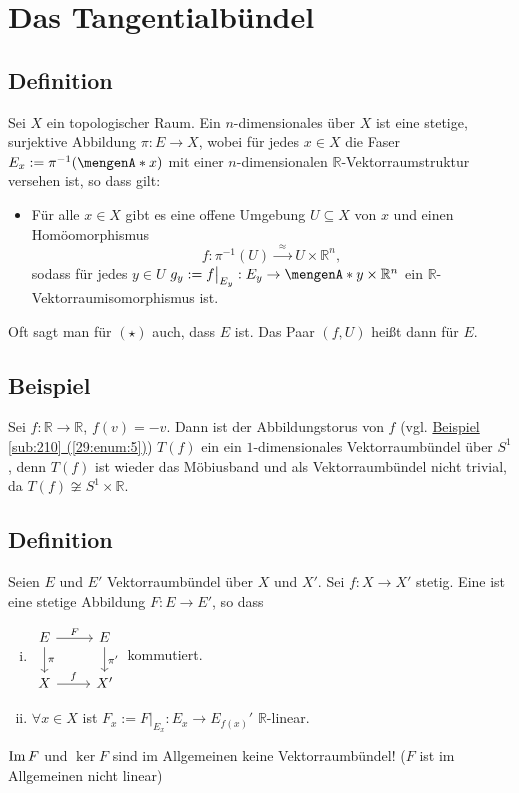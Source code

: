 \section{Das Tangentialbündel} %
\label{sec:19}

\subsection[Definition: Vektorraumbündel]{Definition} %
\label{sub:191}
Sei $X$ ein topologischer Raum. Ein $n$-dimensionales  über $X$ ist eine stetige, surjektive Abbildung $\pi  : E \to X$, wobei für jedes 
$x \in X$ die Faser $E_x := \pi ^{-1} (\set{x})$ mit einer $n$-dimensionalen $\mathds{R}$-Vektorraumstruktur versehen ist, so dass gilt: 
\begin{itemize}[$(\star)$]
	\item Für alle $x \in X$ gibt es eine offene Umgebung $U \subseteq X$ von $x$ und einen Homöomorphismus 
	\[
		f : \pi ^{-1}(U) \xrightarrow{\enspace\approx \enspace} U \times \mathds{R}^n, 
	\]
	sodass für jedes $y \in U$ $g_y := f \big|_{E_y} : E_y  \to \set{y} \times \mathds{R}^n $ ein $\mathds{R}$-Vektorraumisomorphismus ist.
\end{itemize}
Oft sagt man für $(\star)$ auch, dass $E$  ist. Das Paar $(f,U)$ heißt dann  für $E$.  

\subsection[Beispiel: Das Möbiusband ist ein nichttriviales Vektorraumbündel]{Beispiel} %
\label{sub:192}
Sei $f : \mathds{R} \to \mathds{R}$, $f(v)=-v$. Dann ist der Abbildungstorus von $f$ (vgl. \hyperref[29:enum:5]{Beispiel \ref*{sub:210} (\ref*{29:enum:5})}) $T(f)$ ein ein $1$-dimensionales Vektorraumbündel über $S^1$, denn
$T(f)$ ist wieder das Möbiusband und als Vektorraumbündel nicht trivial, da $T(f) \not\cong S^1 \times \mathds{R}$.

\subsection[Definition: Lineare Abbildung über $f$]{Definition} %
\label{sub:193}
Seien $E$ und $E'$ Vektorraumbündel über $X$ und $X'$. Sei $f : X \to X'$ stetig. Eine  ist eine stetige Abbildung $F : E \to E'$,
so dass 
\begin{enumerate}[(i)]
	\item \(
		\begin{tikzcd}
			E \rar["F"] \dar["\pi"] & E  \dar["\pi'"]\\
			X \rar["f"] & X'
		\end{tikzcd}
	\)
	kommutiert.
	\item $\forall x \in X$ ist $F_x := F \big|_{E_x} : E_x \to E_{f(x)}'$ $\mathds{R}$-linear.
\end{enumerate}
$\operatorname{Im} F$ und $\ker F$ sind im Allgemeinen keine Vektorraumbündel! ($F$ ist im Allgemeinen nicht linear)

